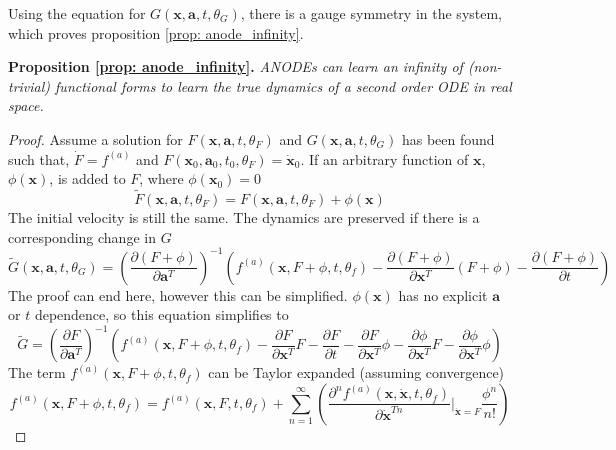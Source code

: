 \documentclass{article}
\theoremstyle{remark}
\theoremstyle{definition}
\begin{document}
Using the equation for $G(\mathbf{x}, \mathbf{a}, t, \theta_{G})$, there is a gauge symmetry in the system, which proves proposition \ref{prop: anode_infinity}.

\textbf{Proposition \ref{prop: anode_infinity}.} \textit{ANODEs can learn an infinity of (non-trivial) functional forms to learn the true dynamics of a second order ODE in real space.}

\begin{proof}
Assume a solution for $F(\mathbf{x}, \mathbf{a}, t, \theta_{F})$ and $G(\mathbf{x},\mathbf{a}, t, \theta_{G})$ has been found such that, $\dot{F} = f^{(a)}$ and $F(\mathbf{x}_{0}, \mathbf{a}_{0}, t_{0}, \theta_{F}) = \dot{\mathbf{x}}_{0}$. If an arbitrary function of $\mathbf{x}$, $\phi(\mathbf{x})$, is added to $F$, where $\phi(\mathbf{x}_{0}) = 0$
\begin{equation}
    \tilde{F}(\mathbf{x}, \mathbf{a}, t, \theta_{F}) = F(\mathbf{x}, \mathbf{a}, t, \theta_{F}) + \phi(\mathbf{x})
\end{equation}
The initial velocity is still the same. The dynamics are preserved if there is a corresponding change in $G$
\begin{equation}
    \tilde{G}(\mathbf{x},\mathbf{a}, t, \theta_{G}) = \left( \frac{\partial (F+\phi)}{\partial \mathbf{a}^{T}}\right)^{-1}
\left(
f^{(a)}(\mathbf{x}, F+\phi, t, \theta_{f}) - \frac{\partial (F+\phi)}{\partial \mathbf{x}^{T}}(F+\phi) - 
\frac{\partial (F+\phi)}{\partial t}
\right)
\end{equation}
The proof can end here, however this can be simplified. $\phi(\mathbf{x})$ has no explicit $\mathbf{a}$ or $t$ dependence, so this equation simplifies to
\begin{equation}
    \tilde{G} = \left( \frac{\partial F}{\partial \mathbf{a}^{T}}\right)^{-1}
\left(
f^{(a)}(\mathbf{x}, F+\phi, t, \theta_{f}) - \frac{\partial F}{\partial \mathbf{x}^{T}}F - 
\frac{\partial F}{\partial t}
-
\frac{\partial F}{\partial \mathbf{x}^{T}}\phi -
\frac{\partial \phi}{\partial \mathbf{x}^{T}}F -
\frac{\partial \phi}{\partial \mathbf{x}^{T}}\phi
\right)
\end{equation}
The term $f^{(a)}(\mathbf{x}, F+\phi, t, \theta_{f})$ can be Taylor expanded (assuming convergence)
\begin{equation}
    f^{(a)}(\mathbf{x}, F+\phi, t, \theta_{f}) =
    f^{(a)}(\mathbf{x}, F, t, \theta_{f}) +
    \sum_{n=1}^{\infty}
    \left(
    \frac{\partial ^{n}f^{(a)}(\mathbf{x}, \dot{\mathbf{x}}, t, \theta_{f})}{\partial \dot{\mathbf{x}}^{Tn}}\Biggr\vert_{\dot{\mathbf{x}}=F}\frac{\phi^{n}}{n!}
    \right)
\end{equation}



\end{proof}
\end{document}
